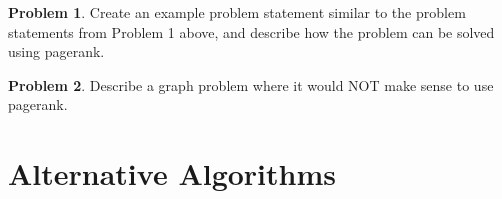 \documentclass[10pt]{exam}
\theoremstyle{definition}
\newtheorem{problem}{Problem}
\newcommand{\x}{\mathbf x}
\newcommand{\ltwo}[1]{{\lVert {#1} \rVert}_2}
\begin{document}
\newpage
\begin{problem}
    Create an example problem statement similar to the problem statements from Problem 1 above,
    and describe how the problem can be solved using pagerank.
\end{problem}

\newpage
\begin{problem}
    Describe a graph problem where it would NOT make sense to use pagerank.
\end{problem}

%

\newpage
\section{Alternative Algorithms}
\end{document}
